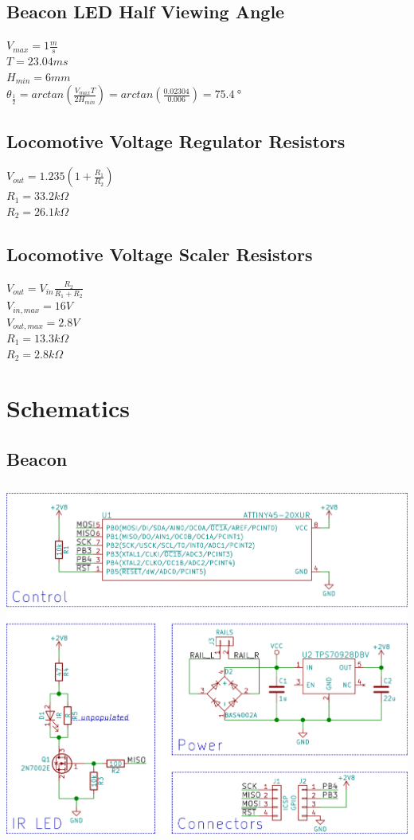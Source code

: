 \documentclass[openbib,letterpaper,10pt]{article}
\begin{document}
\begin{spacing}{1.15}
\begin{appendix}
\subsection{Beacon LED Half Viewing Angle}
$V_{max}=1\frac{m}{s}$ \\
$T=23.04ms$ \\
$H_{min}= 6mm$ \\
$\theta_{\frac{1}{2}}=arctan(\frac{V_{max}T}{2H_{min}})=arctan(\frac{0.02304}{0.006})=\SI{75.4}{\degree}$

\subsection{Locomotive Voltage Regulator Resistors}
$V_{out}=1.235(1+\frac{R_1}{R_2})$ \\
$R_1=33.2k\Omega$ \\
$R_2=26.1k\Omega$

\subsection{Locomotive Voltage Scaler Resistors}
$V_{out}=V_{in}\frac{R_2}{R_1+R_2}$ \\
$V_{in,max}=16V$ \\
$V_{out,max}=2.8V$ \\
$R_1=13.3k\Omega$ \\
$R_2=2.8k\Omega$

\clearpage

\section{Schematics}

\subsection{Beacon}
\begin{center}
\includegraphics[height=32em]{../electronics/beacon/v1.1/images/beacon-sch-small.png}
\end{center}


\end{appendix}
\end{spacing}
\end{document}
